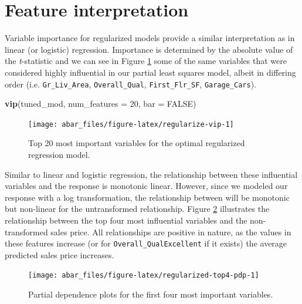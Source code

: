 \documentclass[]{book}
\newenvironment{Shaded}{\begin{snugshade}}{\end{snugshade}}
\newcommand{\DataTypeTok}[1]{\textcolor[rgb]{0.13,0.29,0.53}{#1}}
\newcommand{\DecValTok}[1]{\textcolor[rgb]{0.00,0.00,0.81}{#1}}
\newcommand{\KeywordTok}[1]{\textcolor[rgb]{0.13,0.29,0.53}{\textbf{#1}}}
\newcommand{\NormalTok}[1]{#1}
\newcommand{\OtherTok}[1]{\textcolor[rgb]{0.56,0.35,0.01}{#1}}
\theoremstyle{definition}
\theoremstyle{definition}
\theoremstyle{definition}
\theoremstyle{remark}
\begin{document}
\hypertarget{lm-features}{%
\section{Feature interpretation}\label{lm-features}}

Variable importance for regularized models provide a similar
interpretation as in linear (or logistic) regression. Importance is
determined by the absolute value of the \emph{t}-statistic and we can
see in Figure \ref{fig:regularize-vip} some of the same variables that
were considered highly influential in our partial least squares model,
albeit in differing order (i.e. \texttt{Gr\_Liv\_Area},
\texttt{Overall\_Qual}, \texttt{First\_Flr\_SF}, \texttt{Garage\_Cars}).

\begin{Shaded}
\begin{Highlighting}[]
\KeywordTok{vip}\NormalTok{(tuned_mod, }\DataTypeTok{num_features =} \DecValTok{20}\NormalTok{, }\DataTypeTok{bar =} \OtherTok{FALSE}\NormalTok{)}
\end{Highlighting}
\end{Shaded}

\begin{figure}

{\centering \texttt{[image: abar\_files/figure-latex/regularize-vip-1]} 

}

\caption{Top 20 most important variables for the optimal regularized regression model.}\label{fig:regularize-vip}
\end{figure}

Similar to linear and logistic regression, the relationship between
these influential variables and the response is monotonic linear.
However, since we modeled our response with a log transformation, the
relationship between will be monotonic but non-linear for the
untransformed relationship. Figure \ref{fig:regularized-top4-pdp}
illustrates the relationship between the top four most influential
variables and the non-transformed sales price. All relationships are
positive in nature, as the values in these features increase (or for
\texttt{Overall\_QualExcellent} if it exists) the average predicted
sales price increases.

\begin{figure}

{\centering \texttt{[image: abar\_files/figure-latex/regularized-top4-pdp-1]} 

}

\caption{Partial dependence plots for the first four most important variables.}\label{fig:regularized-top4-pdp}
\end{figure}
\end{document}
